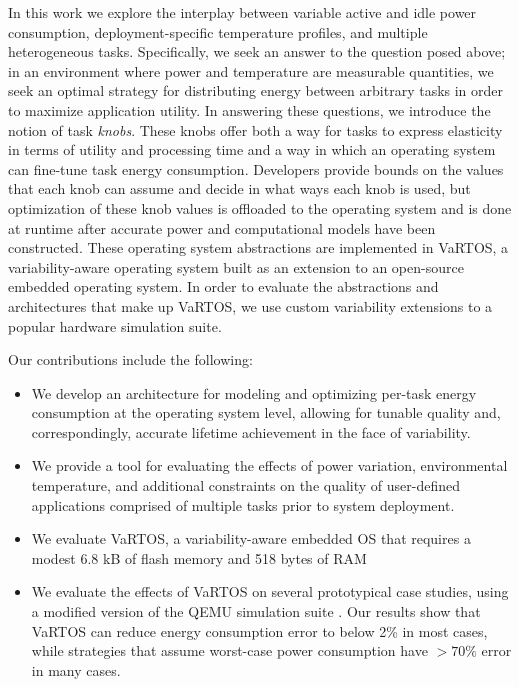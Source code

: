 In this work we explore the interplay between variable active and idle power consumption, deployment-specific temperature profiles, and multiple heterogeneous tasks. Specifically, we seek an answer to the question posed above; in an environment where power and temperature are measurable quantities, we seek an optimal strategy for distributing energy between arbitrary tasks in order to maximize application utility.  In answering these questions, we introduce the notion of task \emph{knobs}.  These knobs offer both a way for tasks to express elasticity in terms of utility and processing time and a way in which an operating system can fine-tune task energy consumption. Developers provide bounds on the values that each knob can assume and decide in what ways each knob is used, but optimization of these knob values is offloaded to the operating system and is done at runtime after accurate power and computational models have been constructed.  These operating system abstractions are implemented in VaRTOS, a variability-aware operating system built as an extension to an open-source embedded operating system. In order to evaluate the abstractions and architectures that make up VaRTOS, we use custom variability extensions to a popular hardware simulation suite. 

Our contributions include the following: 

\begin{itemize}
\item We develop an architecture for modeling and optimizing per-task energy consumption at the operating system level, allowing for tunable quality and, correspondingly, accurate lifetime achievement in the face of variability. 
\item We provide a tool for evaluating the effects of power variation, environmental temperature, and additional constraints on the quality of user-defined applications comprised of multiple tasks prior to system deployment.
\item We evaluate VaRTOS, a variability-aware embedded OS that requires a modest 6.8 kB of flash memory and 518 bytes of RAM
\item We evaluate the effects of VaRTOS on several prototypical case studies, using a modified version of the QEMU simulation suite \cite{qemu}.   Our results show that VaRTOS can reduce energy consumption error to below 2\% in most cases, while strategies that assume worst-case power consumption have $> 70\%$ error in many cases.
\end{itemize}


